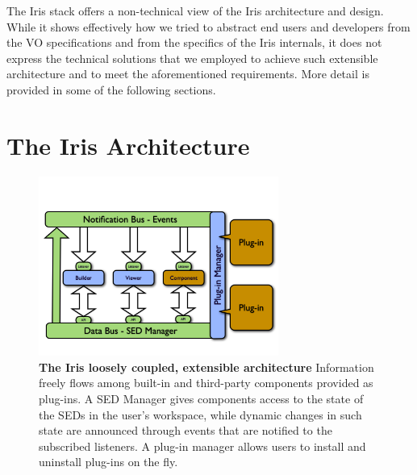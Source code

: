 \documentclass[final,5p,authoryear]{elsarticle}
\begin{document}
The Iris stack offers a non-technical view of the Iris architecture and design.
While it shows effectively how we tried to abstract end users and developers
from the VO specifications and from the specifics of the Iris internals, it does
not express the technical solutions that we employed to achieve such extensible
architecture and to meet the aforementioned requirements. More detail is
provided in some of the following sections.



\section{The Iris Architecture} \label{sec:architecture}

\begin{figure} \begin{center}
\includegraphics[width=0.7\textwidth]{figures/IrisDiagrams.001.png}
\caption{\textbf{The Iris loosely coupled, extensible architecture} Information
freely flows among built-in and third-party components provided as plug-ins. A
SED Manager gives components access to the state of the SEDs in the user's
workspace, while dynamic changes in such state are announced through events that
are notified to the subscribed listeners. A plug-in manager allows users to
install and uninstall plug-ins on the fly.} \label{fig:architecture}
\end{center} \end{figure}
\end{document}
